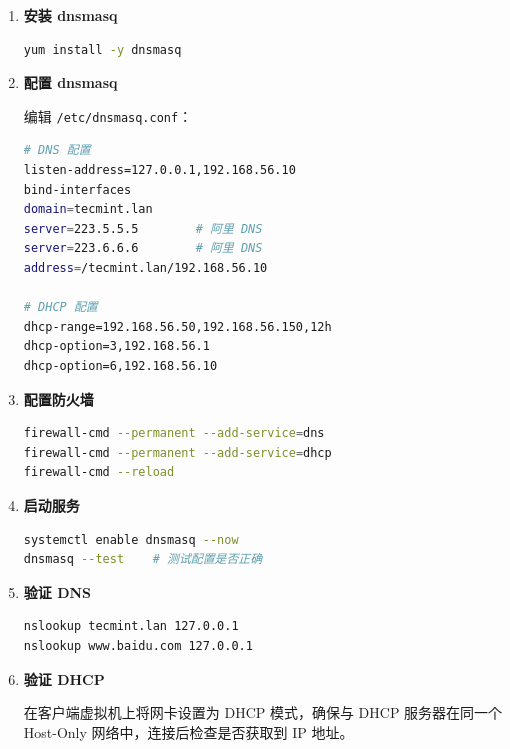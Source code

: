 \documentclass[12pt,a4paper]{ctexart}
\begin{document}
\begin{enumerate}[label=\arabic*.,leftmargin=*]

  \item \textbf{安装 dnsmasq}

  \begin{cmdbox}
  \begin{lstlisting}[language=bash]
yum install -y dnsmasq
  \end{lstlisting}
  \end{cmdbox}

  \item \textbf{配置 dnsmasq}

  编辑 \texttt{/etc/dnsmasq.conf}：

  \begin{cmdbox}
  \small
  \begin{lstlisting}[language=bash]
# DNS 配置
listen-address=127.0.0.1,192.168.56.10
bind-interfaces
domain=tecmint.lan
server=223.5.5.5        # 阿里 DNS
server=223.6.6.6        # 阿里 DNS
address=/tecmint.lan/192.168.56.10

# DHCP 配置
dhcp-range=192.168.56.50,192.168.56.150,12h
dhcp-option=3,192.168.56.1
dhcp-option=6,192.168.56.10
  \end{lstlisting}
  \end{cmdbox}

  \item \textbf{配置防火墙}

  \begin{cmdbox}
  \begin{lstlisting}[language=bash]
firewall-cmd --permanent --add-service=dns
firewall-cmd --permanent --add-service=dhcp
firewall-cmd --reload
  \end{lstlisting}
  \end{cmdbox}

  \item \textbf{启动服务}

  \begin{cmdbox}
  \begin{lstlisting}[language=bash]
systemctl enable dnsmasq --now
dnsmasq --test    # 测试配置是否正确
  \end{lstlisting}
  \end{cmdbox}

  \item \textbf{验证 DNS}

  \begin{cmdbox}
  \begin{lstlisting}[language=bash]
nslookup tecmint.lan 127.0.0.1
nslookup www.baidu.com 127.0.0.1
  \end{lstlisting}
  \end{cmdbox}

  \item \textbf{验证 DHCP}

  在客户端虚拟机上将网卡设置为 DHCP 模式，确保与 DHCP 服务器在同一个 Host-Only 网络中，连接后检查是否获取到 IP 地址。

\end{enumerate}
\end{document}
